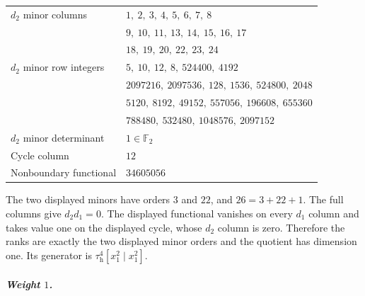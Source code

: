 \begin{longtable}{l l}
$d_2$ minor columns & $1,\ 2,\ 3,\ 4,\ 5,\ 6,\ 7,\ 8$\\
 & $9,\ 10,\ 11,\ 13,\ 14,\ 15,\ 16,\ 17$\\
 & $18,\ 19,\ 20,\ 22,\ 23,\ 24$\\
$d_2$ minor row integers & $5,\ 10,\ 12,\ 8,\ 524400,\ 4192$\\
 & $2097216,\ 2097536,\ 128,\ 1536,\ 524800,\ 2048$\\
 & $5120,\ 8192,\ 49152,\ 557056,\ 196608,\ 655360$\\
 & $788480,\ 532480,\ 1048576,\ 2097152$\\
$d_2$ minor determinant & $1\in\mathbb F_2$\\
Cycle column & $12$\\
Nonboundary functional & $34605056$\\
\end{longtable}
The two displayed minors have orders $3$ and $22$, and $26=3+22+1$. 
The full columns give $d_2d_1=0$. The displayed functional vanishes on every $d_1$ column and takes value one on the displayed cycle, whose $d_2$ column is zero. Therefore the ranks are exactly the two displayed minor orders and the quotient has dimension one. Its generator is $\tau_{\mathrm h}^{4}[x_1^2\mid x_1^2]$.
\subparagraph{Weight $1$.}
